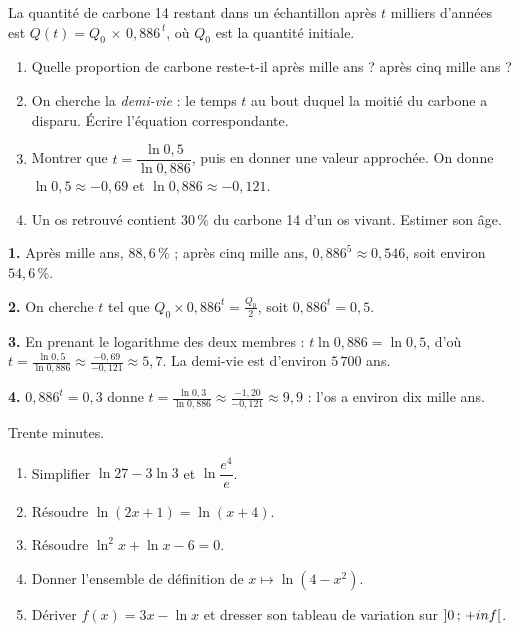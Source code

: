 \begin{jecherche}
La quantité de carbone 14 restant dans un échantillon après $t$ milliers
d'années est $Q(t) = Q_{0}\,\times\,0{,}886^{\,t}$, où $Q_{0}$ est la
quantité initiale.

\begin{enumerate}[label=\textbf{\arabic*.}, leftmargin=*, itemsep=0.3em]
  \item Quelle proportion de carbone reste-t-il après mille ans ? après
        cinq mille ans ?
  \item On cherche la \emph{demi-vie} : le temps $t$ au bout duquel la
        moitié du carbone a disparu. Écrire l'équation correspondante.
  \item Montrer que $t = \dfrac{\ln 0{,}5}{\ln 0{,}886}$, puis en donner une
        valeur approchée. On donne $\ln 0{,}5 \approx -0{,}69$ et
        $\ln 0{,}886 \approx -0{,}121$.
  \item Un os retrouvé contient $30\,\%$ du carbone 14 d'un os vivant.
        Estimer son âge.
\end{enumerate}
\end{jecherche}

\begin{corrige}
\textbf{1.} Après mille ans, $88{,}6\,\%$ ; après cinq mille ans,
$0{,}886^{5} \approx 0{,}546$, soit environ $54{,}6\,\%$.

\textbf{2.} On cherche $t$ tel que $Q_{0}\times0{,}886^{t}
= \frac{Q_{0}}{2}$, soit $0{,}886^{t} = 0{,}5$.

\textbf{3.} En prenant le logarithme des deux membres :
$t\ln 0{,}886 = \ln 0{,}5$, d'où
$t = \frac{\ln0{,}5}{\ln0{,}886} \approx \frac{-0{,}69}{-0{,}121}
\approx 5{,}7$. La demi-vie est d'environ $5\,700$ ans.

\textbf{4.} $0{,}886^{t} = 0{,}3$ donne
$t = \frac{\ln0{,}3}{\ln0{,}886} \approx \frac{-1{,}20}{-0{,}121}
\approx 9{,}9$ : l'os a environ dix mille ans.
\end{corrige}

\begin{jemeteste}
Trente minutes.

\begin{enumerate}[label=\textbf{\arabic*.}, leftmargin=*, itemsep=0.3em]
  \item Simplifier $\ln 27-3\ln 3$ et $\ln\dfrac{e^{4}}{e}$.
  \item Résoudre $\ln(2x+1) = \ln(x+4)$.
  \item Résoudre $\ln^{2}x+\ln x-6 = 0$.
  \item Donner l'ensemble de définition de $x \mapsto \ln(4-x^{2})$.
  \item Dériver $f(x) = 3x-\ln x$ et dresser son tableau de variation sur
        $\left]0\,;\,+inf\right[$.
\end{enumerate}
\end{jemeteste}

